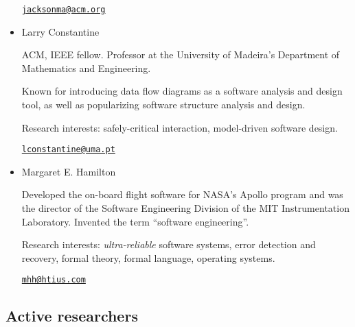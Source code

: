 \documentclass[a4paper]{article}
\begin{document}
\begin{itemize}
                \href{mailto:jacksonma@acm.org}{\texttt{jacksonma@acm.org}}

                \item
                Larry Constantine

                ACM, IEEE fellow.
                Professor at the University of Madeira's Department of Mathematics and Engineering.

                Known for introducing data flow diagrams as a software analysis and design tool, as well as popularizing software structure analysis and design.

                Research interests: safely-critical interaction, model-driven software design.

                \href{mailto:lconstantine@uma.pt}{\texttt{lconstantine@uma.pt}}

                
                \item Margaret E. Hamilton
                
                Developed the on-board flight software for NASA's Apollo program and was the director of the Software Engineering Division of the MIT Instrumentation Laboratory. Invented the term ``software engineering''.

                Research interests: \emph{ultra-reliable} software systems, error detection and recovery, formal theory, formal language, operating systems.

                \href{mailto:mhh@htius.com}{\texttt{mhh@htius.com}}


            \end{itemize}

        \subsection*{Active researchers}
\end{document}
